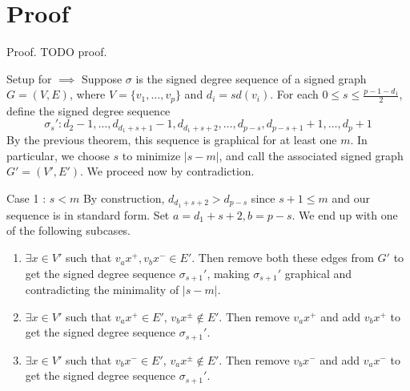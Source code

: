 \section{Proof}

\begin{frame}{Proof.}
	TODO proof.
\end{frame}

\begin{frame}{Setup for $\implies$}
	Suppose $\sigma$ is the signed degree sequence of a signed graph $G = (V,E)$, where $V = \{v_1,\dots,v_p\}$ and $d_i = sd(v_i)$. For each $0 \leq s \leq \frac{p-1-d_1}{2}$, define the signed degree sequence
	\begin{equation*}
		\sigma_s' : d_2-1,\dots,d_{d_1+s+1}-1,d_{d_1+s+2},\dots,d_{p-s},d_{p-s+1}+1,\dots,d_p+1
	\end{equation*}
	By the previous theorem, this sequence is graphical for at least one $m$. In particular, we choose $s$ to minimize $|s-m|$, and call the associated signed graph $G' = (V',E')$. We proceed now by contradiction.
\end{frame}

\begin{frame}{Case 1 : $s < m$}
	By construction, $d_{d_1+s+2} > d_{p-s}$ since $s+1 \leq m$ and our sequence is in standard form. Set $a = d_1+s+2, b = p - s$. We end up with one of the following subcases.
	\begin{enumerate}
		\item $\exists x \in V'$ such that $v_ax^{+}, v_bx^{-} \in E'$. Then remove both these edges from $G'$ to get the signed degree sequence $\sigma_{s+1}'$, making $\sigma_{s+1}'$ graphical and contradicting the minimality of $|s - m|$.
		\item $\exists x \in V'$ such that $v_ax^{+} \in E'$, $v_bx^{\pm} \notin E'$. Then remove $v_ax^{+}$ and add $v_bx^{+}$ to get the signed degree sequence $\sigma_{s+1}'$.
		\item $\exists x \in V'$ such that $v_bx^{-} \in E'$, $v_ax^{\pm} \notin E'$. Then remove $v_bx^{-}$ and add $v_ax^{-}$ to get the signed degree sequence $\sigma_{s+1}'$.
	\end{enumerate}
\end{frame}

